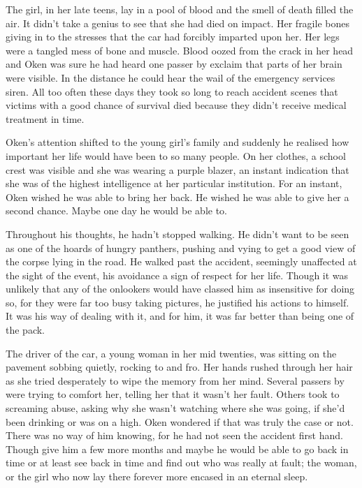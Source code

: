 The girl, in her late teens, lay in a pool of blood and the smell of death filled the air. It didn't take a genius to see that she had died on impact. Her fragile bones giving in to the stresses that the car had forcibly imparted upon her. Her legs were a tangled mess of bone and muscle. Blood oozed from the crack in her head and Oken was sure he had heard one passer by exclaim that parts of her brain were visible. In the distance he could hear the wail of the emergency services siren. All too often these days they took so long to reach accident scenes that victims with a good chance of survival died because they didn't receive medical treatment in time.

Oken's attention shifted to the young girl's family and suddenly he realised how important her life would have been to so many people. On her clothes, a school crest was visible and she was wearing a purple blazer, an instant indication that she was of the highest intelligence at her particular institution. For an instant, Oken wished he was able to bring her back. He wished he was able to give her a second chance. Maybe one day he would be able to.

Throughout his thoughts, he hadn't stopped walking. He didn't want to be seen as one of the hoards of hungry panthers, pushing and vying to get a good view of the corpse lying in the road. He walked past the accident, seemingly unaffected at the sight of the event, his avoidance a sign of respect for her life. Though it was unlikely that any of the onlookers would have classed him as insensitive for doing so, for they were far too busy taking pictures, he justified his actions to himself. It was his way of dealing with it, and for him, it was far better than being one of the pack.

The driver of the car, a young woman in her mid twenties, was sitting on the pavement sobbing quietly, rocking to and fro. Her hands rushed through her hair as she tried desperately to wipe the memory from her mind. Several passers by were trying to comfort her, telling her that it wasn't her fault. Others took to screaming abuse, asking why she wasn't watching where she was going, if she'd been drinking or was on a high. Oken wondered if that was truly the case or not. There was no way of him knowing, for he had not seen the accident first hand. Though give him a few more months and maybe he would be able to go back in time or at least see back in time and find out who was really at fault; the woman, or the girl who now lay there forever more encased in an eternal sleep.

